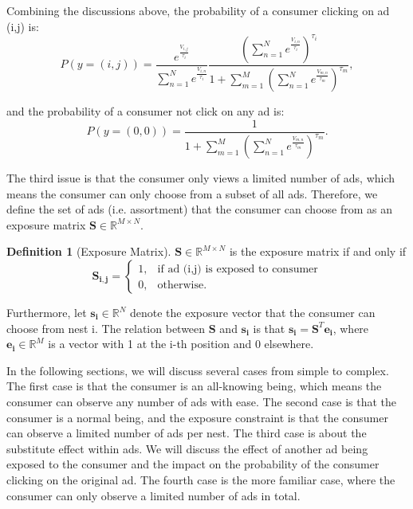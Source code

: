 \documentclass[12pt]{article}
\theoremstyle{definition}
\newtheorem{definition}{Definition}[section]
\newcommand{\matr}[1]{\mathbf{#1}} %
\begin{document}
\begin{sloppypar}
Combining the discussions above, the probability of a consumer clicking on ad (i,j) is:
\begin{equation}
    P(y=(i,j)) 
        = \frac{e^\frac{{V_{i,j}}}{\tau_i}}{\sum_{n=1}^{N} e^\frac{{V_{i,n}}}{\tau_i}} \frac{(\sum_{n=1}^{N} e^\frac{{V_{i,n}}}{\tau_i})^{\tau_i}}{1+\sum_{m=1}^{M}(\sum_{n=1}^{N} e^\frac{{V_{m,n}}}{\tau_m})^{\tau_m}},
\end{equation}

and the probability of a consumer not click on any ad is:
\begin{equation}
    P(y=(0,0)) 
        = \frac{1}{1+\sum_{m=1}^{M}(\sum_{n=1}^{N} e^\frac{{V_{m,n}}}{\tau_m})^{\tau_m}}.
\end{equation}

The third issue is that the consumer only views a limited number of ads, which means the consumer can only choose from a subset of all ads. Therefore, we define the set of ads (i.e. assortment) that the consumer can choose from as an exposure matrix $\matr{S} \in \mathbb{R}^{M \times N}$.

\begin{definition}[Exposure Matrix]\label{exposure matrix}
    $\matr{S} \in \mathbb{R}^{M \times N}$ is the exposure matrix if and only if
    \begin{equation*}
        \matr{S_{i,j}} = 
            \begin{cases}
            1, & \text{if ad (i,j) is exposed to consumer} \\
            0, & \text{otherwise}.
            \end{cases}
    \end{equation*}
\end{definition}

Furthermore, let $\matr{s_i} \in \mathbb{R}^{N}$ denote the exposure vector that the consumer can choose from nest i. The relation between $\matr{S}$ and $\matr{s_i}$ is that $\matr{s_i} = \matr{S}^T \matr{e_i}$, where $\matr{e_i} \in \mathbb{R}^{M}$ is a vector with 1 at the i-th position and 0 elsewhere.

In the following sections, we will discuss several cases from simple to complex. The first case is that the consumer is an all-knowing being, which means the consumer can observe any number of ads with ease. The second case is that the consumer is a normal being, and the exposure constraint is that the consumer can observe a limited number of ads per nest. The third case is about the substitute effect within ads. We will discuss the effect of another ad being exposed to the consumer and the impact on the probability of the consumer clicking on the original ad. The fourth case is the more familiar case, where the consumer can only observe a limited number of ads in total.


\end{sloppypar}
\end{document}
